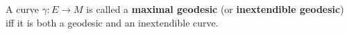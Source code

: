 A curve $\gamma: E \rightarrow M$ is called a \textbf{maximal geodesic} (or \textbf{inextendible geodesic}) iff it is both a geodesic and an inextendible curve.
